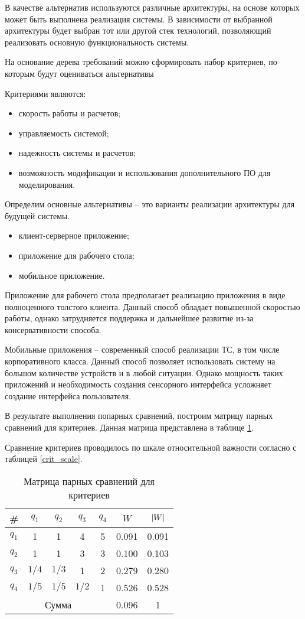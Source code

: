 В качестве альтернатив используются различные архитектуры, на основе которых может быть выполнена реализация системы. 
В зависимости от выбранной архитектуры будет выбран тот или другой стек технологий, позволяющий реализовать основную функциональность системы. 

На основание дерева требований можно сформировать набор критериев, по которым будут оцениваться альтернативы

Критериями являются:
\begin{itemize}
  \item скорость работы и расчетов;
  \item управляемость системой;
  \item надежность системы и расчетов;
  \item возможность модификации и использования дополнительного ПО для моделирования.
\end{itemize}

Определим основные альтернативы – это варианты реализации архитектуры для будущей системы.
\begin{itemize}
    \item клиент-серверное приложение;
    \item приложение для рабочего стола;
    \item мобильное приложение.
\end{itemize}

Приложение для рабочего стола предполагает реализацию приложения в виде полноценного толстого клиента. 
Данный способ обладает повышенной скоростью работы, однако затрудняется поддержка и дальнейшее развитие из-за консервативности способа. 

Мобильные приложения – современный способ реализации ТС, в том числе корпоративного класса. 
Данный способ позволяет использовать систему на большом количестве устройств и в любой ситуации. 
Однако мощность таких приложений и необходимость создания сенсорного интерфейса усложняет создание интерфейса пользователя.

В результате выполнения попарных сравнений, построим матрицу парных сравнений для критериев. 
Данная матрица представлена в таблице \ref{crit_compare}.

Сравнение критериев проводилось по шкале относительной важности согласно с таблицей \ref{crit_scale}.

\begin{table}[H]
    \centering
    \caption{Матрица парных сравнений для критериев}\label{crit_compare}
    \begin{tabular}{|c|c|c|c|c|c|c|}
    \hline \# & $q_1$ & $q_2$ & $q_3$ & $q_4$ & $W$ & $\abs{W}$ \\
    \hline $q_1$ & 1 & 1 & 4 & 5 & 0.091 & 0.091 \\
    \hline $q_2$ & 1 & 1 & 3 & 3 & 0.100 & 0.103 \\
    \hline $q_3$ & $1/4$ & $1/3$ & 1 & 2 & 0.279 & 0.280 \\
    \hline $q_4$ & $1/5$ & $1/5$ & $1/2$ & 1 & 0.526 & 0.528 \\
    \hline \multicolumn{5}{|c|}{Сумма} & 0.096 & 1 \\
    \hline
    \end{tabular}
\end{table}

